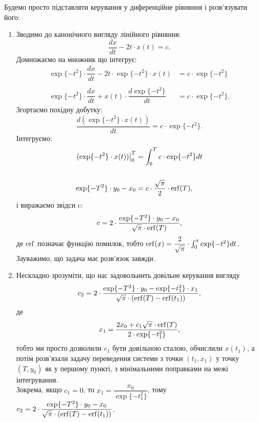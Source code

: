 \begin{solution}
Будемо просто підставляти керування у диференційне рівняння і розв'язувати його:
\begin{enumerate}
\item Зводимо до канонічного вигляду лінійного рівняння:
\[ \dfrac{dx}{dt} - 2t \cdot x(t) = c. \]
Домножаємо на множник що інтегрує:
\begin{align*}
    \exp\{-t^2\} \cdot \dfrac{dx}{dt} - 2 t \cdot \exp\{-t^2\} \cdot x(t) &= c \cdot \exp\{-t^2\} \\
    \\
    \exp\{-t^2\} \cdot \dfrac{dx}{dt} + x(t) \cdot \dfrac {d \exp\{-t^2\}} {dt} &= c \cdot \exp\{-t^2\}.
\end{align*}
Згортаємо похідну добутку:
\[ \dfrac {d (\exp\{-t^2\} \cdot x(t))} {dt} = c \cdot \exp\{-t^2\}. \]
Інтегруємо:
\begin{align*}
    \left.(\exp\{-t^2\} \cdot x(t))\right|_0^T &= \int_0^T c \cdot \exp\{-t^2\} dt \\
    \\
    \exp\{-T^2\} \cdot y_0 - x_0 &= c \cdot \dfrac {\sqrt \pi} 2 \cdot \operatorname{erf} (T),
\end{align*}
і виражаємо звідси $c$:
\[ c = 2 \cdot \dfrac{\exp\{-T^2\} \cdot y_0 - x_0} {\sqrt \pi \cdot \operatorname{erf} (T)}, \]
де $\operatorname{erf}$ позначає функцію помилок, тобто $\operatorname{erf}(x) = \dfrac 2 {\sqrt \pi} \cdot \int_0^x \exp\{-t^2\} dt$.\\

Зауважимо, що задача має розв'язок завжди.
\item Нескладно зрозуміти, що нас задовольнить довільне керування вигляду
\[ c_2 = 2 \cdot \dfrac{\exp\{-T^2\} \cdot y_0 - \exp\{-t_1^2\} \cdot x_1} {\sqrt \pi \cdot (\operatorname{erf} (T) - \operatorname{erf} (t_1))},\] де \[ x_1 = \dfrac{2x_0 + c_1\sqrt \pi \cdot \operatorname{erf} (T)}{2\cdot \exp\{-t_1^2\}}, \]
тобто  ми просто дозволили $c_1$ бути довільною сталою, обчислили $x(t_1)$, а потім розв'язали задачу переведення системи з точки $(t_1, x_1)$ у точку $(T, y_0)$ як у першому пункті, з мінімальними поправками на межі інтегрування. \\

Зокрема, якщо $c_1 = 0$, то $x_1 = \dfrac {x_0} {\exp\{-t_1^2\}}$, тому $c_2 = 2 \cdot \dfrac{\exp\{-T^2\} \cdot y_0 - x_0} {\sqrt \pi \cdot (\operatorname{erf} (T) - \operatorname{erf} (t_1))}$.\\


\end{enumerate}
\end{solution}
